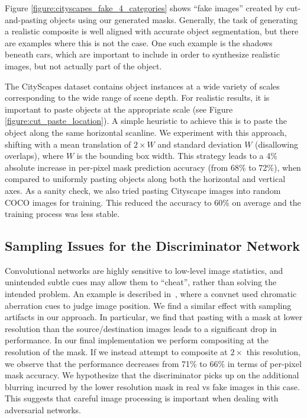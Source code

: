 \documentclass[runningheads]{llncs}
\begin{document}
Figure \ref{figure:cityscapes_fake_4_categories} shows ``fake images'' created by cut-and-pasting objects using our generated masks.
Generally, the task of generating a realistic composite is well aligned with accurate object segmentation, but there are examples where this is not the case. One such example is the shadows beneath cars, which are important to include in order to synthesize realistic images, but not actually part of the object.


The CityScapes dataset contains object instances at a wide variety of scales corresponding to the wide range of scene depth. For realistic results, it is important to paste objects at the appropriate scale (see Figure \ref{figure:cut_paste_location}). A simple heuristic to achieve this is to paste the object along the same horizontal scanline. We experiment with this approach, shifting with a mean translation of $2\times W$ and standard deviation $W$ (disallowing overlaps), where $W$ is the bounding box width.  This strategy leads to a 4\% absolute increase in per-pixel mask prediction accuracy (from 68\%
to 72\%), when compared to uniformly pasting objects along both the
horizontal and vertical axes. As a sanity check, we also tried pasting Cityscape images into random COCO images for training. This reduced the accuracy to $60\%$ on average and the training process was less stable.

\subsection{Sampling Issues for the Discriminator Network}\label{sec:sampling_issues}
Convolutional networks are highly sensitive to low-level image statistics, and unintended subtle cues may allow them to ``cheat'', rather than solving the intended problem. An example is described in~\cite{doersch2015unsupervised}, where a convnet used chromatic aberration cues to judge image position. We find a similar effect with sampling artifacts in our approach. In particular, we find that pasting with a mask at lower resolution than the source/destination images leads to a significant drop in performance. In our final implementation we perform compositing at the resolution
of the mask. If we instead attempt to composite at $2 \times$ this resolution, we observe that the performance decreases from 71\% to 66\% in terms of per-pixel mask accuracy. We hypothesize that the discriminator picks up on the additional blurring incurred by the lower resolution mask in real vs fake images in this case.
This suggests that careful image processing is important when dealing with adversarial networks.
\end{document}

